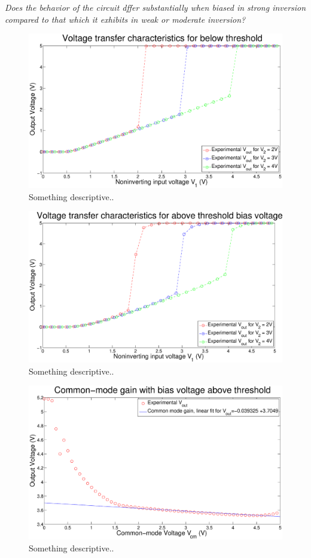 \documentclass{article}
\begin{document}
\textit{Does the behavior of the circuit dffer substantially when biased in strong inversion compared to that which it exhibits in
weak or moderate inversion?}

\begin{figure}[H]
\centering
\includegraphics[width=\linewidth]{../Figures/Exp1P2.eps}
\caption{Something descriptive..}
\label{fig:exp1p2}
\end{figure}

\begin{figure}[H]
\centering
\includegraphics[width=\linewidth]{../Figures/Exp1P3.eps}
\caption{Something descriptive..}
\label{fig:exp1p3}
\end{figure}

\begin{figure}[H]
\centering
\includegraphics[width=\linewidth]{../Figures/Exp1P4.eps}
\caption{Something descriptive..}
\label{fig:exp1p4}
\end{figure}
\end{document}
